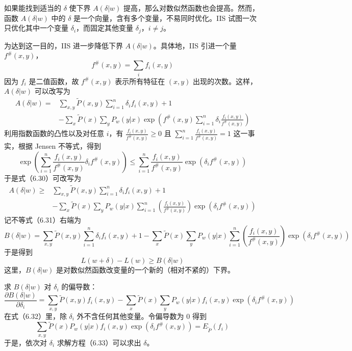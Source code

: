 \documentclass[UTF8,12pt,a4paper,fontset=fandol]{ctexart}
\begin{document}
如果能找到适当的 $\delta$ 使下界 $A(\delta|w)$ 提高，那么对数似然函数也会提高。然而，函数 $A(\delta|w)$ 中的 $\delta$ 是一个向量，含有多个变量，不易同时优化。IIS 试图一次只优化其中一个变量 $\delta_i$，而固定其他变量 $\delta_j$，$i\neq j$。

为达到这一目的，IIS 进一步降低下界 $A(\delta|w)$。具体地，IIS 引进一个量 $f^\#(x,y)$，
\[
f^\#(x,y)=\sum_i f_i(x,y)
\]
因为 $f_i$ 是二值函数，故 $f^\#(x,y)$ 表示所有特征在 $(x,y)$ 出现的次数。这样，$A(\delta|w)$ 可以改写为
\begin{equation}
\begin{aligned}
A(\delta|w)={}&\sum_{x,y}\tilde{P}(x,y)\sum_{i=1}^n\delta_i f_i(x,y)+1\\
&-\sum_x\tilde{P}(x)\sum_y P_w(y|x)\exp\left(f^\#(x,y)\sum_{i=1}^n\delta_i\frac{f_i(x,y)}{f^\#(x,y)}\right)
\end{aligned}
\tag{6.30}
\end{equation}
利用指数函数的凸性以及对任意 $i$，有 $\frac{f_i(x,y)}{f^\#(x,y)}\geq 0$ 且 $\sum_{i=1}^n\frac{f_i(x,y)}{f^\#(x,y)}=1$ 这一事实，根据 Jensen 不等式，得到
\[
\exp\left(\sum_{i=1}^n\frac{f_i(x,y)}{f^\#(x,y)}\delta_i f^\#(x,y)\right)
\leq \sum_{i=1}^n\frac{f_i(x,y)}{f^\#(x,y)}\exp(\delta_i f^\#(x,y))
\]
于是式（6.30）可改写为
\begin{equation}
\begin{aligned}
A(\delta|w)\geq{}& \sum_{x,y}\tilde{P}(x,y)\sum_{i=1}^n\delta_i f_i(x,y)+1\\
&-\sum_x\tilde{P}(x)\sum_y P_w(y|x)\sum_{i=1}^n\left(\frac{f_i(x,y)}{f^\#(x,y)}\right)\exp(\delta_i f^\#(x,y))
\end{aligned}
\tag{6.31}
\end{equation}
记不等式（6.31）右端为
\[
B(\delta|w)=\sum_{x,y}\tilde{P}(x,y)\sum_{i=1}^n\delta_i f_i(x,y)+1
-\sum_x\tilde{P}(x)\sum_y P_w(y|x)\sum_{i=1}^n\left(\frac{f_i(x,y)}{f^\#(x,y)}\right)\exp(\delta_i f^\#(x,y))
\]
于是得到
\[
L(w+\delta)-L(w)\geq B(\delta|w)
\]
这里，$B(\delta|w)$ 是对数似然函数改变量的一个新的（相对不紧的）下界。

求 $B(\delta|w)$ 对 $\delta_i$ 的偏导数：
\begin{equation}
\frac{\partial B(\delta|w)}{\partial\delta_i}
=\sum_{x,y}\tilde{P}(x,y)f_i(x,y)
-\sum_x\tilde{P}(x)\sum_y P_w(y|x)f_i(x,y)\exp(\delta_i f^\#(x,y))
\tag{6.32}
\end{equation}
在式（6.32）里，除 $\delta_i$ 外不含任何其他变量。令偏导数为 0 得到
\begin{equation}
\sum_{x,y}\tilde{P}(x)P_w(y|x)f_i(x,y)\exp(\delta_i f^\#(x,y))=E_{\tilde{P}}(f_i)
\tag{6.33}
\end{equation}
于是，依次对 $\delta_i$ 求解方程（6.33）可以求出 $\delta$。
\end{document}
